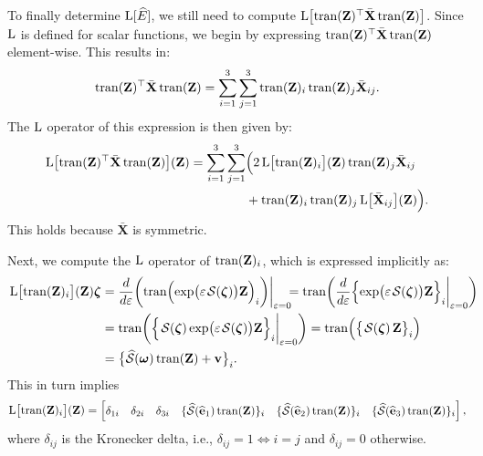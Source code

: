 To finally determine $\operatorname{L}[\widehat{E}]$, we still need to compute $\operatorname{L}\bigl[\operatorname{tran}(\mathbf{Z})^\top\bar{\mathbf{X}}\operatorname{tran}(\mathbf{Z})\bigr]$. Since $\operatorname{L}$ is defined for scalar functions, we begin by expressing $\operatorname{tran}(\mathbf{Z})^\top\bar{\mathbf{X}}\operatorname{tran}(\mathbf{Z})$ element-wise. This results in:
\begin{align}
    \operatorname{tran}(\mathbf{Z})^\top\bar{\mathbf{X}}\operatorname{tran}(\mathbf{Z}) = \sum_{i=1}^{3}\sum_{j=1}^{3} \operatorname{tran}(\mathbf{Z})_{i}\operatorname{tran}(\mathbf{Z})_{j}\bar{\mathbf{X}}_{ij}.
\end{align}
The $\operatorname{L}$ operator of this expression is then given by:
\begin{align}
    \begin{split}
        \operatorname{L}\bigl[\operatorname{tran}(\mathbf{Z})^\top\bar{\mathbf{X}}\operatorname{tran}(\mathbf{Z})\bigr](\mathbf{Z}) = \sum_{i=1}^{3}\sum_{j=1}^{3}& \Bigl(2\operatorname{L}\bigl[\operatorname{tran}(\mathbf{Z})_{i}\bigr](\mathbf{Z})\operatorname{tran}(\mathbf{Z})_{j}\bar{\mathbf{X}}_{ij} \\
        & +\operatorname{tran}(\mathbf{Z})_{i}\operatorname{tran}(\mathbf{Z})_{j}\operatorname{L}\bigl[\bar{\mathbf{X}}_{ij}\bigr](\mathbf{Z})\Bigr). \label{eq:appendix-L-zXz-final-sum}
    \end{split}
\end{align}
This holds because $\bar{\mathbf{X}}$ is symmetric. 

Next, we compute the $\operatorname{L}$ operator of $\operatorname{tran}(\mathbf{Z})_{i}$, which is expressed implicitly as:
\begin{align}
    \begin{split}
        \Lop\bigl[\trans(\mathbf{Z})_{i}\bigr](\mathbf{Z}) \boldsymbol{\zeta}&= 
        \frac{d}{d\varepsilon}\biggl(\trans\Bigl(\exp\bigl(\varepsilon\SL[\boldsymbol{\zeta}]\bigr)\mathbf{Z}\Bigr)_{i}\biggr)\biggr|_{\varepsilon=0}\!\!\! = 
        \trans\biggl(\frac{d}{d\varepsilon}\Bigl\{\exp\bigl(\varepsilon\SL[\boldsymbol{\zeta}]\bigr)\mathbf{Z}\Bigr\}_{i}\biggr|_{\varepsilon=0}\biggr) \!\!\!\!\!\!\\
        &= \trans\biggl(\Bigl\{\SL[\boldsymbol{\zeta}]\exp\bigl(\varepsilon\SL[\boldsymbol{\zeta}]\bigr)\mathbf{Z}\Bigr\}_{i}\biggr|_{\varepsilon=0}\biggr)
        = \trans\Bigl(\bigl\{\SL[\boldsymbol{\zeta}]\mathbf{Z}\bigr\}_{i}\Bigr)\\
        &= \bigl\{\widehat{\mathcal{S}}(\boldsymbol{\omega})\trans(\mathbf{Z}) + \mathbf{v}\bigr\}_{i}.
    \end{split}
\end{align}
This in turn implies
\begin{align}
    \operatorname{L}\bigl[\operatorname{tran}(\mathbf{Z})_{i}\bigr](\mathbf{Z}) = \begin{bmatrix}
        \delta_{1i} & \delta_{2i} & \delta_{3i} & \{\widehat{\mathcal{S}}(\widehat{\mathbf{e}}_1)\operatorname{tran}(\mathbf{Z})\}_i & \{\widehat{\mathcal{S}}(\widehat{\mathbf{e}}_2)\operatorname{tran}(\mathbf{Z})\}_i & \{\widehat{\mathcal{S}}(\widehat{\mathbf{e}}_3)\operatorname{tran}(\mathbf{Z})\}_i
    \end{bmatrix},
\end{align}
where $\delta_{ij}$ is the Kronecker delta, i.e., $\delta_{ij}=1 \iff i=j$ and $\delta_{ij}=0$ otherwise. 

